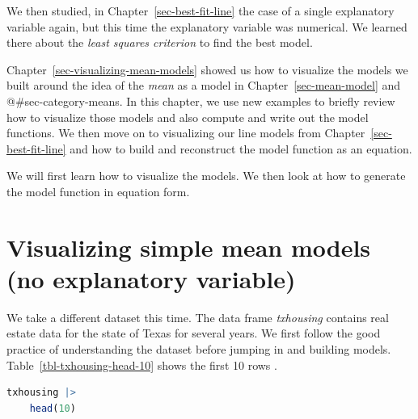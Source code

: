 \documentclass[
  12pt,
  letterpaper,
  DIV=11,
  numbers=noendperiod]{scrreprt}
\begin{document}
We then studied, in Chapter~\ref{sec-best-fit-line} the case of a single
explanatory variable again, but this time the explanatory variable was
numerical. We learned there about the \emph{least squares criterion} to
find the best model.

Chapter~\ref{sec-visualizing-mean-models} showed us how to visualize the
models we built around the idea of the \emph{mean} as a model in
Chapter~\ref{sec-mean-model} and @\#sec-category-means. In this chapter,
we use new examples to briefly review how to visualize those models and
also compute and write out the model functions. We then move on to
visualizing our line models from Chapter~\ref{sec-best-fit-line} and how
to build and reconstruct the model function as an equation.

We will first learn how to visualize the models. We then look at how to
generate the model function in equation form.

\section{Visualizing simple mean models (no explanatory
variable)}\label{visualizing-simple-mean-models-no-explanatory-variable}

We take a different dataset this time. The data frame \emph{txhousing}
contains real estate data for the state of Texas for several years. We
first follow the good practice of understanding the dataset before
jumping in and building models. Table~\ref{tbl-txhousing-head-10} shows
the first 10 rows .

\begin{lstlisting}[language=R]
txhousing |>
    head(10) 
\end{lstlisting}
\end{document}
